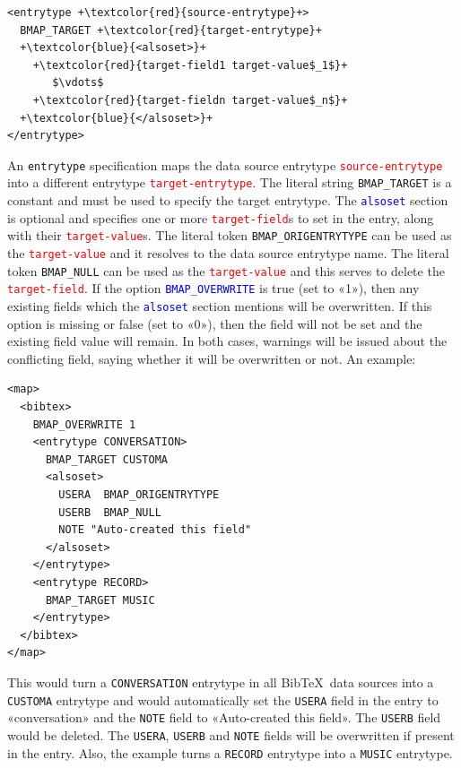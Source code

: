 \documentclass{ltxdockit}
\begin{document}

\lstset{showspaces=false}
\begin{lstlisting}[escapechar=+,mathescape=true]
<entrytype +\textcolor{red}{source-entrytype}+>
  BMAP_TARGET +\textcolor{red}{target-entrytype}+
  +\textcolor{blue}{<alsoset>}+
    +\textcolor{red}{target-field1 target-value$_1$}+
       $\vdots$
    +\textcolor{red}{target-fieldn target-value$_n$}+
  +\textcolor{blue}{</alsoset>}+
</entrytype>
\end{lstlisting}

\noindent An \verb+entrytype+ specification maps the data source entrytype
\textcolor{red}{\texttt{source-entrytype}} into a different
entrytype \textcolor{red}{\texttt{target-entrytype}}. The literal string
\verb+BMAP_TARGET+ is a constant and must be used to specify the target
entrytype. The \textcolor{blue}{\texttt{alsoset}} section is optional and
specifies one or more \textcolor{red}{\texttt{target-field}}s to set in the
entry, along with their \textcolor{red}{\texttt{target-value}}s. The
literal token \verb+BMAP_ORIGENTRYTYPE+ can be used as the
\textcolor{red}{\texttt{target-value}} and it resolves to the data source
entrytype name. The literal token \verb+BMAP_NULL+ can be used as the
\textcolor{red}{\texttt{target-value}} and this serves to delete the
\textcolor{red}{\texttt{target-field}}. If the option
\textcolor{blue}{\texttt{BMAP\_OVERWRITE}} is true (set to «1»), then any
existing fields which the \textcolor{blue}{\texttt{alsoset}} section
mentions will be overwritten. If this option is missing or false (set to
«0»), then the field will not be set and the existing field value will
remain. In both cases, warnings will be issued about the conflicting field,
saying whether it will be overwritten or not. An example:

\lstset{showspaces=false}
\begin{lstlisting}[escapechar=+,mathescape=true]
<map>
  <bibtex>
    BMAP_OVERWRITE 1
    <entrytype CONVERSATION>
      BMAP_TARGET CUSTOMA
      <alsoset>
        USERA  BMAP_ORIGENTRYTYPE
        USERB  BMAP_NULL
        NOTE "Auto-created this field"
      </alsoset>
    </entrytype>
    <entrytype RECORD>
      BMAP_TARGET MUSIC
    </entrytype>
  </bibtex>
</map>
\end{lstlisting}

\noindent This would turn a \verb+CONVERSATION+ entrytype in all
Bib\TeX\ data sources into a \verb+CUSTOMA+ entrytype
and would automatically set the \verb+USERA+ field in the entry to
«conversation» and the \verb+NOTE+ field to «Auto-created this field». The
\verb+USERB+ field would be deleted. The
\verb+USERA+, \verb+USERB+ and \verb+NOTE+ fields will be overwritten if present in the
entry. Also, the example turns a \verb+RECORD+ entrytype into a \verb+MUSIC+ entrytype.
\bigskip
{}
\end{document}

